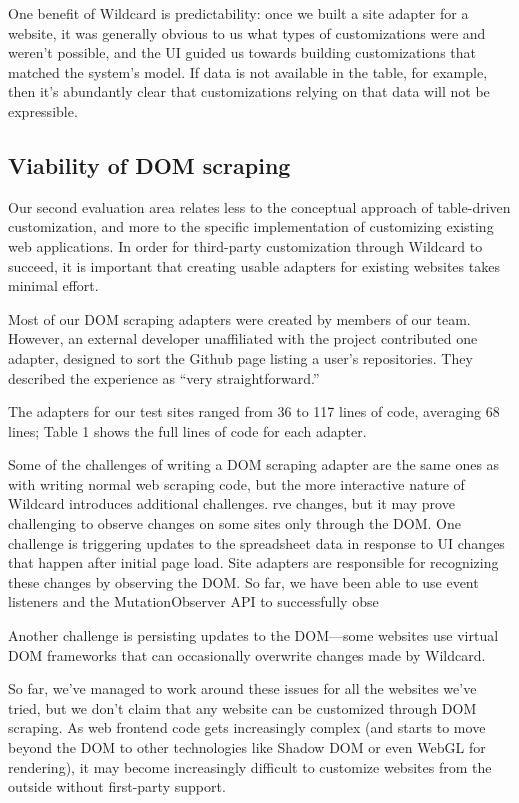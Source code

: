 \documentclass[sigplan,screen,10pt,anonymous,review]{acmart}
\begin{document}
One benefit of Wildcard is predictability: once we built a site adapter
for a website, it was generally obvious to us what types of
customizations were and weren't possible, and the UI guided us towards
building customizations that matched the system's model. If data is not
available in the table, for example, then it's abundantly clear that
customizations relying on that data will not be expressible.

\hypertarget{viability-of-dom-scraping}{%
\subsection{Viability of DOM scraping}\label{viability-of-dom-scraping}}

Our second evaluation area relates less to the conceptual approach of
table-driven customization, and more to the specific implementation of
customizing existing web applications. In order for third-party
customization through Wildcard to succeed, it is important that creating
usable adapters for existing websites takes minimal effort.

Most of our DOM scraping adapters were created by members of our team.
However, an external developer unaffiliated with the project contributed
one adapter, designed to sort the Github page listing a user's
repositories. They described the experience as ``very straightforward.''

The adapters for our test sites ranged from 36 to 117 lines of code,
averaging 68 lines; Table 1 shows the full lines of code for each
adapter.

Some of the challenges of writing a DOM scraping adapter are the same
ones as with writing normal web scraping code, but the more interactive
nature of Wildcard introduces additional challenges. rve changes, but it
may prove challenging to observe changes on some sites only through the
DOM. One challenge is triggering updates to the spreadsheet data in
response to UI changes that happen after initial page load. Site
adapters are responsible for recognizing these changes by observing the
DOM. So far, we have been able to use event listeners and the
MutationObserver API to successfully obse

Another challenge is persisting updates to the DOM---some websites use
virtual DOM frameworks that can occasionally overwrite changes made by
Wildcard.

So far, we've managed to work around these issues for all the websites
we've tried, but we don't claim that any website can be customized
through DOM scraping. As web frontend code gets increasingly complex
(and starts to move beyond the DOM to other technologies like Shadow DOM
or even WebGL for rendering), it may become increasingly difficult to
customize websites from the outside without first-party support.
\end{document}
